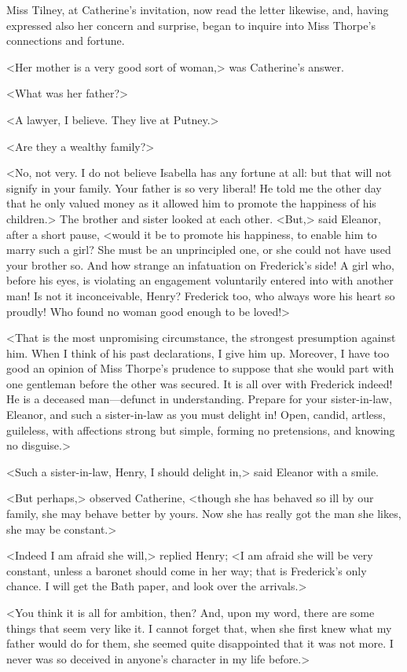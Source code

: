  Miss Tilney, at Catherine's invitation, now read the letter likewise, and, having expressed also her concern and surprise, began to inquire into Miss Thorpe's connections and fortune. 

 <Her mother is a very good sort of woman,> was Catherine's answer. 

 <What was her father?> 

 <A lawyer, I believe. They live at Putney.> 

 <Are they a wealthy family?> 

 <No, not very. I do not believe Isabella has any fortune at all: but that will not signify in your family. Your father is so very liberal! He told me the other day that he only valued money as it allowed him to promote the happiness of his children.> The brother and sister looked at each other. <But,> said Eleanor, after a short pause, <would it be to promote his happiness, to enable him to marry such a girl? She must be an unprincipled one, or she could not have used your brother so. And how strange an infatuation on Frederick's side! A girl who, before his eyes, is violating an engagement voluntarily entered into with another man! Is not it inconceivable, Henry? Frederick too, who always wore his heart so proudly! Who found no woman good enough to be loved!> 

 <That is the most unpromising circumstance, the strongest presumption against him. When I think of his past declarations, I give him up. Moreover, I have too good an opinion of Miss Thorpe's prudence to suppose that she would part with one gentleman before the other was secured. It is all over with Frederick indeed! He is a deceased man—defunct in understanding. Prepare for your sister-in-law, Eleanor, and such a sister-in-law as you must delight in! Open, candid, artless, guileless, with affections strong but simple, forming no pretensions, and knowing no disguise.> 

 <Such a sister-in-law, Henry, I should delight in,> said Eleanor with a smile. 

 <But perhaps,> observed Catherine, <though she has behaved so ill by our family, she may behave better by yours. Now she has really got the man she likes, she may be constant.> 

 <Indeed I am afraid she will,> replied Henry; <I am afraid she will be very constant, unless a baronet should come in her way; that is Frederick's only chance. I will get the Bath paper, and look over the arrivals.> 

 <You think it is all for ambition, then? And, upon my word, there are some things that seem very like it. I cannot forget that, when she first knew what my father would do for them, she seemed quite disappointed that it was not more. I never was so deceived in anyone's character in my life before.> 

